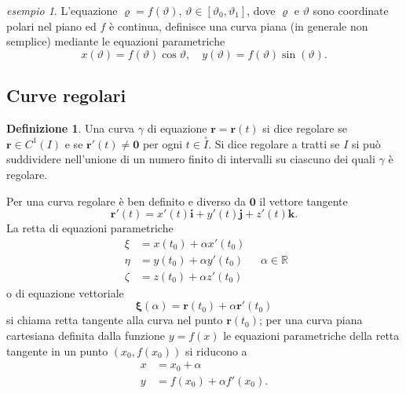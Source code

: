 \documentclass[a4paper]{book}
\numberwithin{equation}{section}
\renewcommand{\theta}{\vartheta}
\renewcommand{\rho}{\varrho}
\theoremstyle{plain}
\theoremstyle{definition}
\newtheorem{defn}{Definizione}[section]
\theoremstyle{remark}
\renewcommand{\vec}{\boldsymbol}
\theoremstyle{example}
\newtheorem{exmp}{esempio}[section]
\begin{document}
\begin{exmp}
	L'equazione $\rho = f(\theta)$, $\theta \in [\theta_0, \theta_1]$, dove $\rho$ e $\theta$ sono coordinate polari nel piano ed $f$ è continua, definisce una curva piana (in generale non semplice) mediante le equazioni parametriche
	\begin{equation*}
		x(\theta) = f(\theta)\cos\theta, \quad y(\theta) = f(\theta)\sin(\theta).
	\end{equation*}
\end{exmp}

\subsection{Curve regolari}
\begin{defn}
	Una curva $\gamma$ di equazione $\vec{r} = \vec{r}(t)$ si dice regolare se $\vec{r} \in C^1(I)$ e se $\vec{r}'(t) \ne \vec{0}$ per ogni $t \in \overset{\circ}{I}$. Si dice regolare a tratti se $I$ si può suddividere nell'unione di un numero finito di intervalli su ciascuno dei quali $\gamma$ è regolare.
\end{defn}

Per una curva regolare è ben definito e diverso da $\vec{0}$ il vettore tangente
\begin{equation*}
	\vec{r}'(t) = x'(t)\vec{i} + y'(t)\vec{j} + z'(t)\vec{k}.
\end{equation*}
La retta di equazioni parametriche
\begin{equation*}
	\begin{split}
		\xi &= x(t_0) + \alpha x'(t_0) \\
		\eta &= y(t_0) + \alpha y'(t_0) \\
		\zeta &= z(t_0) + \alpha z'(t_0)
	\end{split}
	\quad \alpha \in \mathbb{R}
\end{equation*}
o di equazione vettoriale
\begin{equation*}
	\vec{\xi}(\alpha) = \vec{r}(t_0) + \alpha \vec{r}'(t_0)
\end{equation*}
si chiama retta tangente alla curva nel punto $\vec{r}(t_0)$; per una curva piana cartesiana definita dalla funzione $y = f(x)$ le equazioni parametriche della retta tangente in un punto $(x_0, f(x_0))$ si riducono a
\begin{equation*}
	\begin{split}
		x &= x_0 + \alpha \\
		y &= f(x_0) + \alpha f'(x_0).
	\end{split}
\end{equation*}
\end{document}
